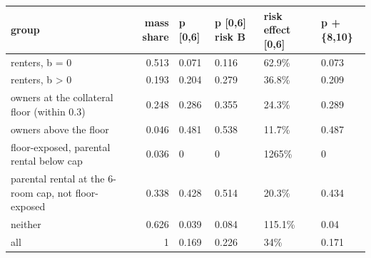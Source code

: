 \begingroup\small
\setlength{\tabcolsep}{3pt}
\renewcommand{\arraystretch}{1.04}
\begin{tabularx}{\linewidth}{XrXXXX}
\toprule
group & mass share & p [0,6] & p [0,6] risk B & risk effect [0,6] & p +\{8,10\} \\
\midrule
renters, b = 0 & 0.513 & 0.071 & 0.116 & 62.9\% & 0.073 \\
renters, b \textgreater{} 0 & 0.193 & 0.204 & 0.279 & 36.8\% & 0.209 \\
owners at the collateral floor (within 0.3) & 0.248 & 0.286 & 0.355 & 24.3\% & 0.289 \\
owners above the floor & 0.046 & 0.481 & 0.538 & 11.7\% & 0.487 \\
floor-exposed, parental rental below cap & 0.036 & 0 & 0 & 1265\% & 0 \\
parental rental at the 6-room cap, not floor-exposed & 0.338 & 0.428 & 0.514 & 20.3\% & 0.434 \\
neither & 0.626 & 0.039 & 0.084 & 115.1\% & 0.04 \\
all & 1 & 0.169 & 0.226 & 34\% & 0.171 \\
\bottomrule
\end{tabularx}
\endgroup
